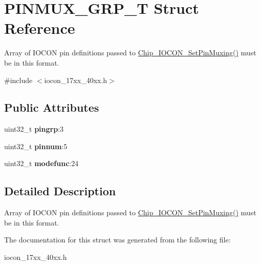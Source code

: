 \hypertarget{struct_p_i_n_m_u_x___g_r_p___t}{\section{P\+I\+N\+M\+U\+X\+\_\+\+G\+R\+P\+\_\+\+T Struct Reference}
\label{struct_p_i_n_m_u_x___g_r_p___t}
}


Array of I\+O\+C\+O\+N pin definitions passed to \hyperlink{group___i_o_c_o_n__17_x_x__40_x_x_gad97c96e401016cf296e6d20454f1c522}{Chip\+\_\+\+I\+O\+C\+O\+N\+\_\+\+Set\+Pin\+Muxing()} must be in this format.  




{\ttfamily \#include $<$iocon\+\_\+17xx\+\_\+40xx.\+h$>$}

\subsection*{Public Attributes}
\begin{DoxyCompactItemize}
\item 
\hypertarget{struct_p_i_n_m_u_x___g_r_p___t_a500436bd5b250eda1bac290e285d9e0d}{uint32\+\_\+t {\bfseries pingrp}\+:3}\label{struct_p_i_n_m_u_x___g_r_p___t_a500436bd5b250eda1bac290e285d9e0d}

\item 
\hypertarget{struct_p_i_n_m_u_x___g_r_p___t_a7e2e3cb5f08e82cdad3ff8b215d0d448}{uint32\+\_\+t {\bfseries pinnum}\+:5}\label{struct_p_i_n_m_u_x___g_r_p___t_a7e2e3cb5f08e82cdad3ff8b215d0d448}

\item 
\hypertarget{struct_p_i_n_m_u_x___g_r_p___t_a32ddff5b2f6776cc4c3d22e14c85d75a}{uint32\+\_\+t {\bfseries modefunc}\+:24}\label{struct_p_i_n_m_u_x___g_r_p___t_a32ddff5b2f6776cc4c3d22e14c85d75a}

\end{DoxyCompactItemize}


\subsection{Detailed Description}
Array of I\+O\+C\+O\+N pin definitions passed to \hyperlink{group___i_o_c_o_n__17_x_x__40_x_x_gad97c96e401016cf296e6d20454f1c522}{Chip\+\_\+\+I\+O\+C\+O\+N\+\_\+\+Set\+Pin\+Muxing()} must be in this format. 

The documentation for this struct was generated from the following file\+:\begin{DoxyCompactItemize}
\item 
iocon\+\_\+17xx\+\_\+40xx.\+h\end{DoxyCompactItemize}
